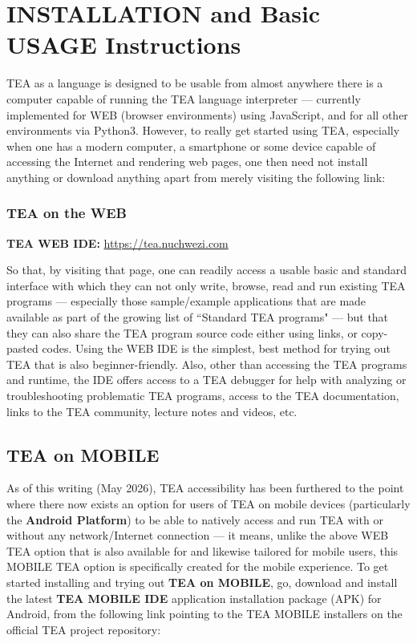\documentclass[a4paper, 18pt]{book} %
\begin{document}
\section{INSTALLATION and Basic USAGE Instructions}


TEA as a language is designed to be usable from almost anywhere there is a computer capable of running the TEA language interpreter --- currently implemented for WEB (browser environments) using JavaScript, and for all other environments via Python3. However, to really get started using TEA, especially when one has a modern computer, a smartphone or some device capable of accessing the Internet and rendering web pages, one then need not install anything or download anything apart from merely visiting the following link:

\subsubsection{TEA on the WEB}

\vspace{2em}
\textbf{TEA WEB IDE:} \url{https://tea.nuchwezi.com}
\vspace{2em}

So that, by visiting that page, one can readily access a usable basic and standard interface with which they can not only write, browse, read and run existing TEA programs --- especially those sample/example applications that are made available as part of the growing list of ``Standard TEA programs" --- but that they can also share the TEA program source code either using links, or copy-pasted codes. Using the WEB IDE is the simplest, best method for trying out TEA that is also beginner-friendly. Also, other than accessing the TEA programs and runtime, the IDE offers access to a TEA debugger for help with analyzing or troubleshooting problematic TEA programs, access to the TEA documentation, links to the TEA community, lecture notes and videos, etc.

\vspace{2em}

\subsection{TEA on MOBILE}

As of this writing (May 2026), TEA accessibility has been furthered to the point where there now exists an option for users of TEA on mobile devices (particularly the \textbf{Android Platform}) to be able to natively access and run TEA with or without any network/Internet connection --- it means, unlike the above WEB TEA option that is also available for and likewise tailored for mobile users, this MOBILE TEA option is specifically created for the mobile experience. To get started installing and trying out \textbf{TEA on  MOBILE}, go, download and install the latest \textbf{TEA MOBILE IDE} application installation package (APK) for Android, from the following link pointing to the TEA MOBILE installers on the official TEA project repository:
\end{document}
